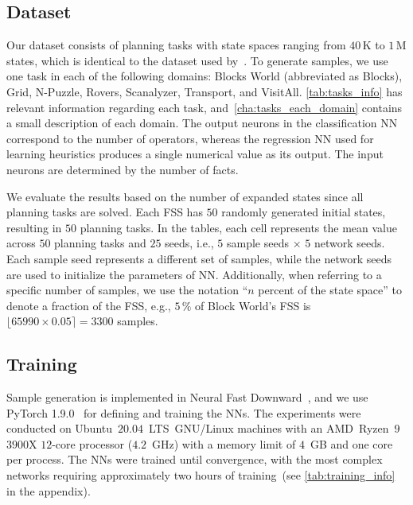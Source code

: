 \documentclass[ppgc,diss,english]{iiufrgs}
\begin{document}
\subsection{Dataset}
\label{sec:exp-dataset}
Our dataset consists of planning tasks with state spaces ranging from $40$\,K to $1$\,M states, which is identical to the dataset used by~\citet{Bettker.etal/2022}. To generate samples, we use one task in each of the following domains: Blocks World (abbreviated as Blocks), Grid, N-Puzzle, Rovers, Scanalyzer, Transport, and VisitAll. \cref{tab:tasks_info} has relevant information regarding each task, and~\vref{cha:tasks_each_domain} contains a small description of each domain. The output neurons in the classification NN correspond to the number of operators, whereas the regression NN used for learning heuristics produces a single numerical value as its output. The input neurons are determined by the number of facts.


We evaluate the results based on the number of expanded states since all planning tasks are solved. Each FSS has $50$ randomly generated initial states, resulting in $50$ planning tasks. %
In the tables, each cell represents the mean value across $50$ planning tasks and $25$ seeds, i.e., $5$ sample seeds $\times$ $5$ network seeds. Each sample seed represents a different set of samples, while the network seeds are used to initialize the parameters of NN.
Additionally, when referring to a specific number of samples, we use the notation ``$n$ percent of the state space'' to denote a fraction of the FSS, e.g., $5\,\%$ of Block World's FSS is $\lfloor 65990 \times 0.05 \rceil = 3300$ samples.



\subsection{Training}
\label{sec:exp-training}
Sample generation is implemented in Neural Fast Downward~\cite{Ferber.etal/2020a}, and we use PyTorch 1.9.0~\cite{Paszke/2019} for defining and training the NNs. The experiments were conducted on Ubuntu~$20.04$~LTS~GNU/Linux machines with an AMD~Ryzen~$9$~$3900$X $12$-core processor ($4.2$~GHz) with a memory limit of $4$~GB and one core per process. The NNs were trained until convergence, with the most complex networks requiring approximately two hours of training~(see \cref{tab:training_info} in the appendix).
\end{document}
